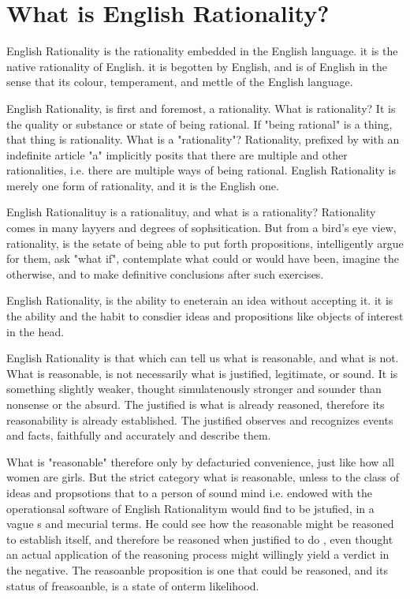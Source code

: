 \chapter{What is English Rationality?}

\separator

English Rationality is the rationality embedded in the English language. it is the native rationality of English. it is begotten by English, and is of English in the sense that its colour, temperament, and mettle of the English language. 

\separator
English Rationality, is first and foremost, a rationality. What is rationality? It is the quality or substance or state of being rational. If "being rational" is a thing, that thing is rationality. What is a "rationality"? Rationality, prefixed by with an indefinite article "a" implicitly posits that there are multiple and other rationalities, i.e. there are multiple ways of being rational. English Rationality is merely one form of rationality, and it is the English one. 

\separator

English Rationalituy is a rationalituy, and what is a rationality? Rationality comes in many layyers and degrees of sophsitication. But from a bird's eye view, rationality, is the setate of being able to put forth propositions, intelligently argue for them, ask "what if", contemplate what could or would have been, imagine the otherwise, and to make definitive conclusions after such exercises. 

\separator

English Rationality, is the ability to eneterain an idea without accepting it. it is the ability and the habit to consdier ideas and propositions like objects of interest in the head. 

\separator

English Rationality is that which can tell us what is reasonable, and what is not.
What is reasonable, is not necessarily what is justified, legitimate, or sound. It is something slightly weaker, thought simulatenously stronger and sounder than  nonsense or the absurd. The justified is what is already reasoned, therefore its reasonability is already established. The justified observes and recognizes events and facts, faithfully and accurately and describe them. 


What is "reasonable"  therefore only by defacturied convenience, just like how all women are girls. But the strict category what is reasonable, unless to the class of ideas and propsotions that to a person of sound mind i.e. endowed with the operationsal software of English Rationalitym would find to be jstufied, in a vague s and mecurial terms. He could see how the reasonable might be reasoned to establish itself, and therefore be reasoned when justified to do , even thought an actual application of the reasoning process might willingly yield a verdict in the negative. The reasoanble proposition is one that could be reasoned, and its status of freasoanble, is a state of onterm likelihood. 

